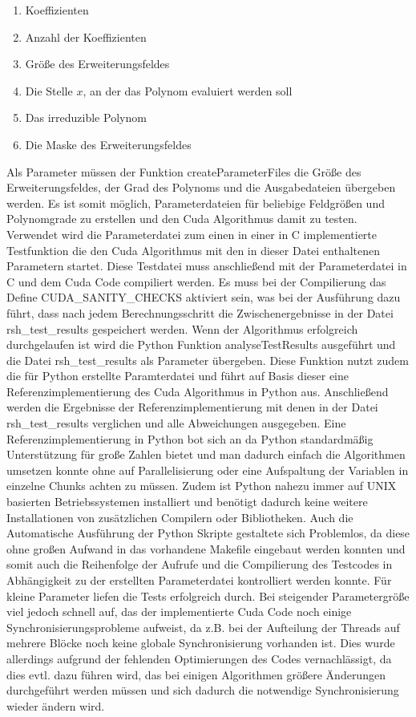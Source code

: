 \begin{enumerate}
\item Koeffizienten
\item Anzahl der Koeffizienten
\item Größe des Erweiterungsfeldes
\item Die Stelle $x$, an der das Polynom evaluiert werden soll
\item Das irreduzible Polynom
\item Die Maske des Erweiterungsfeldes
\end{enumerate}

Als Parameter müssen der Funktion createParameterFiles die Größe des Erweiterungsfeldes, der Grad des Polynoms und die Ausgabedateien übergeben werden. Es ist somit möglich, Parameterdateien für beliebige Feldgrößen und Polynomgrade zu erstellen und den Cuda Algorithmus damit zu testen. 
Verwendet wird die Parameterdatei zum einen in einer in C implementierte Testfunktion die den Cuda Algorithmus mit den in dieser Datei enthaltenen Parametern startet. Diese Testdatei muss anschließend mit der Parameterdatei in C und dem Cuda Code compiliert werden. Es muss bei der Compilierung das Define CUDA\_SANITY\_CHECKS aktiviert sein, was bei der Ausführung dazu führt, dass nach jedem Berechnungsschritt die Zwischenergebnisse in der Datei rsh\_test\_results gespeichert werden. Wenn der Algorithmus erfolgreich durchgelaufen ist wird die Python Funktion analyseTestResults ausgeführt und die Datei rsh\_test\_results als Parameter übergeben. Diese Funktion nutzt zudem die für Python erstellte Paramterdatei und führt auf Basis dieser eine Referenzimplementierung des Cuda Algorithmus in Python aus. Anschließend werden die Ergebnisse der Referenzimplementierung mit denen in der Datei rsh\_test\_results verglichen und alle Abweichungen ausgegeben.\newline
Eine Referenzimplementierung in Python bot sich an da Python standardmäßig Unterstützung für große Zahlen bietet und man dadurch einfach die Algorithmen umsetzen konnte ohne auf Parallelisierung oder eine Aufspaltung der Variablen in einzelne Chunks achten zu müssen. Zudem ist Python nahezu immer auf UNIX basierten Betriebssystemen installiert und benötigt dadurch keine weitere Installationen von zusätzlichen Compilern oder Bibliotheken. Auch die Automatische Ausführung der Python Skripte gestaltete sich Problemlos, da diese ohne großen Aufwand in das vorhandene Makefile eingebaut werden konnten und somit auch die Reihenfolge der Aufrufe und die Compilierung des Testcodes in Abhängigkeit zu der erstellten Parameterdatei kontrolliert werden konnte.\newline
Für kleine Parameter liefen die Tests erfolgreich durch. Bei steigender Parametergröße viel jedoch schnell auf, das der implementierte Cuda Code noch einige Synchronisierungsprobleme aufweist, da z.B. bei der Aufteilung der Threads auf mehrere Blöcke noch keine globale Synchronisierung vorhanden ist. Dies wurde allerdings aufgrund der fehlenden Optimierungen des Codes vernachlässigt, da dies evtl. dazu führen wird, das bei einigen Algorithmen größere Änderungen durchgeführt werden müssen und sich dadurch die notwendige Synchronisierung wieder ändern wird.